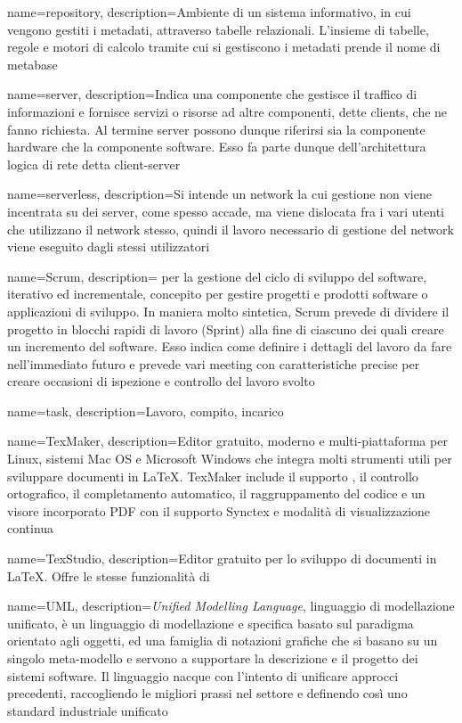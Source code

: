 {
	name=repository,
	description={Ambiente di un sistema informativo, in cui vengono gestiti i metadati, attraverso tabelle relazionali. L'insieme di tabelle, regole e motori di calcolo tramite cui si gestiscono i metadati prende il nome di metabase}
}

{
	name=server,
	description={Indica una componente che gestisce il traffico di informazioni e fornisce servizi o risorse ad altre componenti, dette clients, che ne fanno richiesta. Al termine server possono dunque riferirsi sia la componente hardware che la componente software. Esso fa parte dunque dell'architettura logica di rete detta client-server}
}

{
	name=serverless,
	description={Si intende un network la cui gestione non viene incentrata su dei server, come spesso accade, ma viene dislocata fra i vari utenti che utilizzano il network stesso, quindi il lavoro necessario di gestione del network viene eseguito dagli stessi utilizzatori}
}

{
	name=Scrum,
	description={  per la gestione del ciclo di sviluppo del software, iterativo ed incrementale, concepito per gestire progetti e prodotti software o applicazioni di sviluppo. In maniera molto sintetica, Scrum prevede di dividere il progetto in blocchi rapidi di lavoro (Sprint) alla fine di ciascuno dei quali creare un incremento del software. Esso indica come definire i dettagli del lavoro da fare nell'immediato futuro e prevede vari meeting con caratteristiche precise per creare occasioni di ispezione e controllo del lavoro svolto}
}

{
	name=task,
	description={Lavoro, compito, incarico}
}

{
	name=TexMaker,
	description={Editor gratuito, moderno e multi-piattaforma per Linux, sistemi Mac OS e Microsoft Windows che integra molti strumenti utili per sviluppare documenti in \LaTeX.
	TexMaker include il supporto , il controllo ortografico, il completamento automatico, il raggruppamento del codice e un visore incorporato PDF con il supporto Synctex e modalità di visualizzazione continua}
}

{
	name=TexStudio,
	description={Editor gratuito per lo sviluppo di documenti in \LaTeX{}. Offre le stesse funzionalità di }
}

{
	name=UML,
	description={\emph{Unified Modelling Language}, linguaggio di modellazione unificato, è un linguaggio di modellazione e specifica basato sul paradigma orientato agli oggetti, ed una famiglia di notazioni grafiche che si basano su un singolo meta-modello e servono a supportare la descrizione e il progetto dei sistemi software. Il linguaggio nacque con l'intento di unificare approcci precedenti, raccogliendo le migliori prassi nel settore e definendo così uno standard industriale unificato}
}

